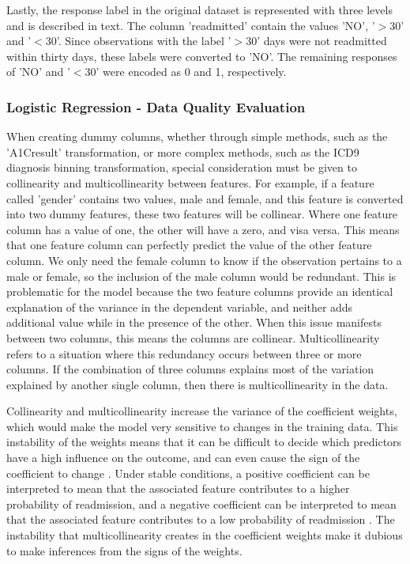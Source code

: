 \documentclass[sigconf]{acmart}
\begin{document}
Lastly, the response label in the original dataset is represented with three levels and is described in text. The column 'readmitted' contain the values 'NO', '$>$30' and '$<$30'. Since observations with the label '$>$30' days were not readmitted within thirty days, these labels were converted to 'NO'. The remaining responses of 'NO' and '$<$30' were encoded as 0 and 1, respectively.

\subsubsection{Logistic Regression - Data Quality Evaluation}

When creating dummy columns, whether through simple methods, such as the 'A1Cresult' transformation, or more complex methods, such as the ICD9 diagnosis binning transformation, special consideration must be given to collinearity and multicollinearity between features. For example, if a feature called 'gender' contains two values, male and female, and this feature is converted into two dummy features, these two features will be collinear. Where one feature column has a value of one, the other will have a zero, and visa versa. This means that one feature column can perfectly predict the value of the other feature column. We only need the female column to know if the observation pertains to a male or female, so the inclusion of the male column would be redundant. This is problematic for the model because the two feature columns provide an identical explanation of the variance in the dependent variable, and neither adds additional value while in the presence of the other. When this issue manifests between two columns, this means the columns are collinear. Multicollinearity refers to a situation where this redundancy occurs between three or more columns. If the combination of three columns explains most of the variation explained by another single column, then there is multicollinearity in the data.

Collinearity and multicollinearity increase the variance of the coefficient weights, which would make the model very sensitive to changes in the training data. This instability of the weights means that it can be difficult to decide which predictors have a high influence on the outcome, and can even cause the sign of the coefficient to change \cite{cite16}. Under stable conditions, a positive coefficient can be interpreted to mean that the associated feature contributes to a higher probability of readmission, and a negative coefficient can be interpreted to mean that the associated feature contributes to a low probability of readmission \cite{cite03}. The instability that multicollinearity creates in the coefficient weights make it dubious to make inferences from the signs of the weights.
\end{document}
